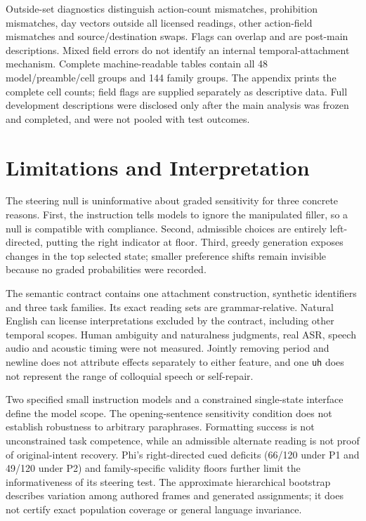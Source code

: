 \documentclass[11pt]{article}
\begin{document}
Outside-set diagnostics distinguish action-count mismatches, prohibition mismatches, day vectors outside all licensed readings, other action-field mismatches and source/destination swaps. Flags can overlap and are post-main descriptions. Mixed field errors do not identify an internal temporal-attachment mechanism. Complete machine-readable tables contain all 48 model/preamble/cell groups and 144 family groups. The appendix prints the complete cell counts; field flags are supplied separately as descriptive data. Full development descriptions were disclosed only after the main analysis was frozen and completed, and were not pooled with test outcomes.

\section{Limitations and Interpretation}
The steering null is uninformative about graded sensitivity for three concrete reasons. First, the instruction tells models to ignore the manipulated filler, so a null is compatible with compliance. Second, admissible choices are entirely left-directed, putting the right indicator at floor. Third, greedy generation exposes changes in the top selected state; smaller preference shifts remain invisible because no graded probabilities were recorded.

The semantic contract contains one attachment construction, synthetic identifiers and three task families. Its exact reading sets are grammar-relative. Natural English can license interpretations excluded by the contract, including other temporal scopes. Human ambiguity and naturalness judgments, real ASR, speech audio and acoustic timing were not measured. Jointly removing period and newline does not attribute effects separately to either feature, and one \texttt{uh} does not represent the range of colloquial speech or self-repair.

Two specified small instruction models and a constrained single-state interface define the model scope. The opening-sentence sensitivity condition does not establish robustness to arbitrary paraphrases. Formatting success is not unconstrained task competence, while an admissible alternate reading is not proof of original-intent recovery. Phi's right-directed cued deficits (66/120 under P1 and 49/120 under P2) and family-specific validity floors further limit the informativeness of its steering test. The approximate hierarchical bootstrap describes variation among authored frames and generated assignments; it does not certify exact population coverage or general language invariance.
\end{document}
